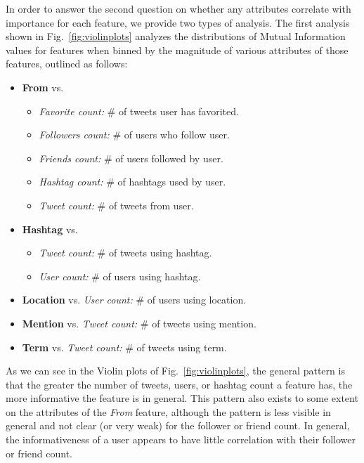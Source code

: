 %

\COMMENT
In order to answer the second question on whether any attributes
correlate with importance for each feature, we provide two types of
analysis. The first analysis shown in Fig.~\ref{fig:violinplots}
analyzes the distributions of Mutual Information values for features
when binned by the magnitude of various attributes of those
features, outlined as follows:
\begin{itemize}
\item \textbf{From} vs. 
\begin{itemize}
\item \textit{Favorite count:} \# of tweets user has favorited.
\item \textit{Followers count:} \# of users who follow user.
\item \textit{Friends count:} \# of users followed by user.
\item \textit{Hashtag count:} \# of hashtags used by user.
\item \textit{Tweet count:} \# of tweets from user.
 \end{itemize}
\end{itemize}
\begin{itemize}
\item \textbf{Hashtag} vs.
\begin{itemize}
\item \textit{Tweet count:} \# of tweets using hashtag.
\item \textit{User count:} \# of users using hashtag.
\end{itemize}
\end{itemize}
\begin{itemize}
\item \textbf{Location} vs. \textit{User count:} \# of users using location.
\item \textbf{Mention} vs. \textit{Tweet count:} \# of tweets using mention.
\item \textbf{Term} vs. \textit{Tweet count:} \# of tweets using term.
\end{itemize}
As we can see in the Violin plots of Fig.~\ref{fig:violinplots}, the
general pattern is that the greater the number of tweets, users, or
hashtag count a feature has, the more informative the feature is in general.
This pattern also exists to some extent on the attributes
of the \textit{From} feature, although the pattern is less visible in
general and not clear (or very weak) for the follower or friend count.
In general, the informativeness of a user appears to have little correlation
with their follower or friend count.


